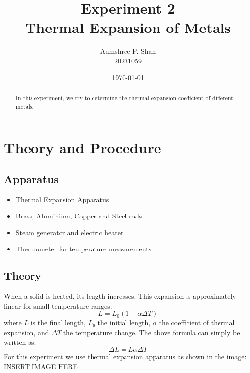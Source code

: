 \documentclass[%
 sor,
 jor,
 amsmath,amssymb,
 reprint,
]{revtex4-2}
\begin{document}
\title{Experiment 2\\Thermal Expansion of Metals}

\author{Aumshree P. Shah\\20231059}
\date{\today}

\begin{abstract}
\centering
In this experiment, we try to determine the thermal expansion coefficient of different metals.
\end{abstract}

\maketitle

\section{Theory and Procedure}
\subsection{Apparatus}
\small
\begin{minipage}{0.48\textwidth}
\begin{itemize}
	\item[] Thermal Expansion Apparatus
	\item[] Brass, Aluminium, Copper and Steel rods 
\end{itemize}
\end{minipage}
\begin{minipage}{0.48\textwidth}
\begin{itemize}
	\item[] Steam generator and electric heater
		\item[] Thermometer for temperature measurements
\end{itemize}
\end{minipage}
\subsection{Theory}
When a solid is heated, its length increases. This expansion is approximately linear for small temperature ranges:
\[
L = L_0 (1 + \alpha \Delta T)
\]
where $L$ is the final length, $L_0$ the initial length, $\alpha$ the coefficient of thermal expansion, and $\Delta T$ the temperature change.
The above formula can simply be written as: $$\Delta L = L \alpha \Delta T $$ For this experiment we use thermal expansion apparatus as shown in the image:\\
INSERT IMAGE HERE
\end{document}
